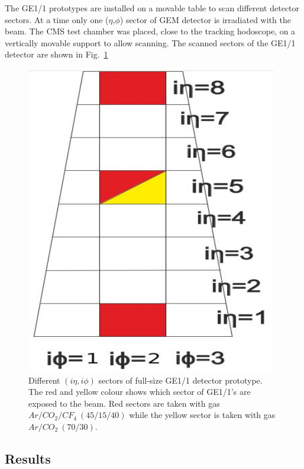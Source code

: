 The GE1/1 prototypes are installed on a movable table to scan different detector sectors. At a time only one ($\eta$,$\phi$) sector of GEM detector is irradiated with the beam.
The CMS test chamber was placed, close to the tracking hodoscope, on a vertically movable support to allow scanning.  The scanned sectors of the GE1/1 detector are shown in Fig.~\ref{GE1/1}
\begin{figure}[!htbp]
\centering
\includegraphics[scale=0.5,angle=90]{figures/GEM/GE11.png}
\caption{Different $(i\eta,i\phi)$ sectors of full-size GE1/1 detector prototype. The red and yellow colour shows which sector of GE1/1's are exposed to the beam. Red sectors are taken with gas $Ar/CO_2/CF_4~(45/15/40)$ while the yellow sector is taken with gas $Ar/CO_2~(70/30)$.}
\label{GE1/1}
\end{figure}
\subsection{Results} %
\label{sub:results}

